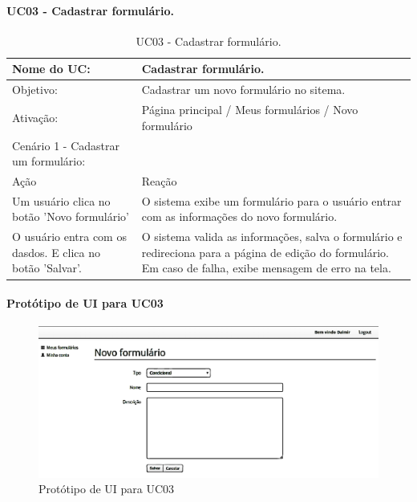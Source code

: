 \documentclass[11pt]{article}
\begin{document}
      \paragraph{UC03 - Cadastrar formulário.} \hspace{10pt}

      \begin{table}[h]
        \begin{center}
          \begin{tabular}{ | p{7cm} | p{8cm} | }
            \hline
            Nome do UC: \cellcolor{gray} & Cadastrar formulário. \\
            \hline
            Objetivo: \cellcolor{gray} & Cadastrar um novo formulário no sitema. \\
            \hline
            Ativação: \cellcolor{gray} & Página principal / Meus formulários / Novo formulário \\
            \hline
            \hline
            Cenário 1 - Cadastrar um formulário: &  \\
            \hline
            Ação\cellcolor{gray} & Reação\cellcolor{gray} \\
            \hline
            Um usuário clica no botão 'Novo formulário' & O sistema exibe um formulário para o usuário entrar com as informações do novo formulário. \\
            \hline
            O usuário entra com os dasdos. E clica no botão 'Salvar'. & O sistema valida as informações, salva o formulário e redireciona para a página de edição do formulário. Em caso de falha, exibe mensagem de erro na tela. \\
            \hline
          \end{tabular}
          \caption{UC03 - Cadastrar formulário.}
        \end{center}
      \end{table}

      \paragraph{Protótipo de UI para UC03} \hspace{10pt}
      
      \begin{figure}[h!]
        \centering
        \includegraphics[width=.9\textwidth]{new_form.png}
        \caption{Protótipo de UI para UC03}
      \end{figure}
\end{document}
